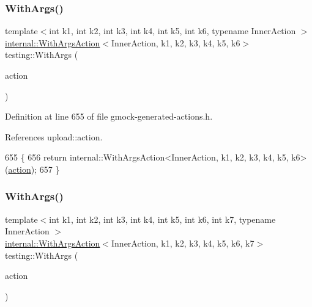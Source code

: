 \subsubsection{\texorpdfstring{With\+Args()}{WithArgs()}\hspace{0.1cm}{\footnotesize\ttfamily [6/10]}}
{\footnotesize\ttfamily template$<$int k1, int k2, int k3, int k4, int k5, int k6, typename Inner\+Action $>$ \\
\hyperlink{classtesting_1_1internal_1_1WithArgsAction}{internal\+::\+With\+Args\+Action}$<$Inner\+Action, k1, k2, k3, k4, k5, k6$>$ testing\+::\+With\+Args (\begin{DoxyParamCaption}\item[{const Inner\+Action \&}]{action }\end{DoxyParamCaption})\hspace{0.3cm}{\ttfamily [inline]}}



Definition at line 655 of file gmock-\/generated-\/actions.\+h.



References upload\+::action.


\begin{DoxyCode}
655                                     \{
656   \textcolor{keywordflow}{return} internal::WithArgsAction<InnerAction, k1, k2, k3, k4, k5, k6>(\hyperlink{namespaceupload_a675d13c979f1c720866d22ed1736f580}{action});
657 \}
\end{DoxyCode}
\mbox{\label{namespacetesting_a04146a27847141c6942e9c67a85aadbe}} 
\subsubsection{\texorpdfstring{With\+Args()}{WithArgs()}\hspace{0.1cm}{\footnotesize\ttfamily [7/10]}}
{\footnotesize\ttfamily template$<$int k1, int k2, int k3, int k4, int k5, int k6, int k7, typename Inner\+Action $>$ \\
\hyperlink{classtesting_1_1internal_1_1WithArgsAction}{internal\+::\+With\+Args\+Action}$<$Inner\+Action, k1, k2, k3, k4, k5, k6, k7$>$ testing\+::\+With\+Args (\begin{DoxyParamCaption}\item[{const Inner\+Action \&}]{action }\end{DoxyParamCaption})\hspace{0.3cm}{\ttfamily [inline]}}



